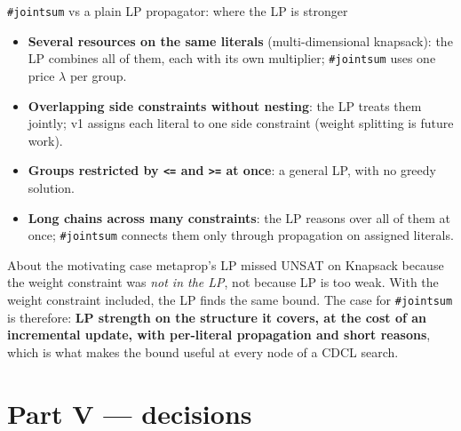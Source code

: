 \documentclass[aspectratio=169,11pt]{beamer}
\begin{document}
\begin{frame}{\texttt{\#jointsum} vs a plain LP propagator: where the LP is stronger}
\footnotesize
\begin{itemize}\setlength\itemsep{4pt}
\item \textbf{Several resources on the same literals} (multi-dimensional knapsack): the LP combines all of them, each with
  its own multiplier; \texttt{\#jointsum} uses one price $\lambda$ per group.
\item \textbf{Overlapping side constraints without nesting}: the LP treats them jointly; v1 assigns each literal to one side
  constraint (weight splitting is future work).
\item \textbf{Groups restricted by \texttt{<=} and \texttt{>=} at once}: a general LP, with no greedy solution.
\item \textbf{Long chains across many constraints}: the LP reasons over all of them at once; \texttt{\#jointsum} connects
  them only through propagation on assigned literals.
\end{itemize}
\vspace{3mm}
\begin{block}{About the motivating case}
metaprop's LP missed UNSAT on Knapsack because the weight constraint was \emph{not in the LP}, not because LP is too weak.
With the weight constraint included, the LP finds the same bound. The case for \texttt{\#jointsum} is therefore:
\textbf{LP strength on the structure it covers, at the cost of an incremental update, with per-literal propagation and
short reasons}, which is what makes the bound useful at every node of a CDCL search.
\end{block}
\end{frame}

\section{Part V --- decisions}
\end{document}
